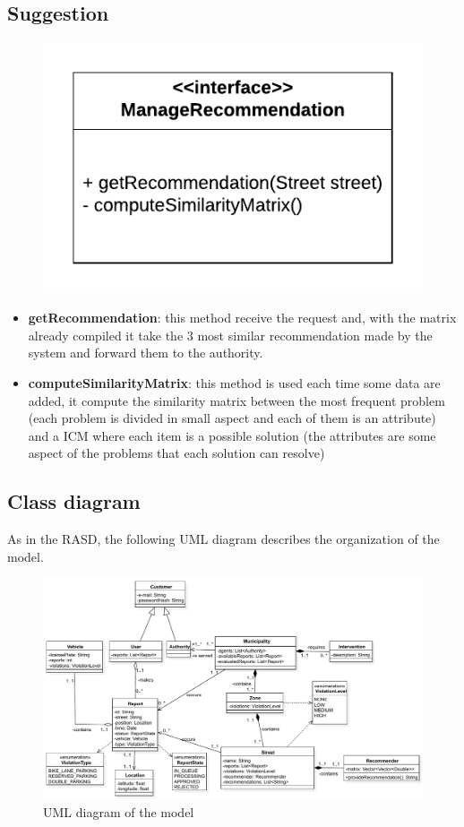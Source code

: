 \documentclass[12pt,a4paper]{report}
\begin{document}
			\subsection{Suggestion}
				\begin{figure}[H]
						\includegraphics [center]{recommendationInterface}
						\label{fig: interfaces}
				\end{figure}
				\begin{itemize}
					\item \textbf{getRecommendation}: this method receive the request and, with the matrix already
						compiled it take the 3 most similar recommendation made by the system and forward them to the
						authority.
					\item \textbf{computeSimilarityMatrix}: this method is used each time some data are added, it compute
					the similarity matrix between the most frequent problem (each problem is divided in small aspect and
					each of them is an attribute) and a ICM where each item is a possible solution (the attributes are some
					aspect of the problems that each solution can resolve)
				\end{itemize}
	
	\subsection{Class diagram}
	As in the RASD, the following UML diagram describes the organization of the model.

		\begin{figure}[H]
				\includegraphics [scale = 0.7, center]{umlfinal}
				\caption{UML diagram of the model}
		\end{figure}
\end{document}
